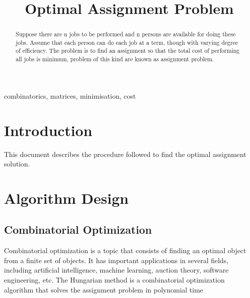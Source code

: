 \documentclass[conference]{IEEEtran}
\begin{document}
\title{Optimal Assignment Problem}

\author{
\and
{}
\and
{}

}

\maketitle

\begin{abstract}
Suppose there are n jobs to be performed and n persons are available for doing these jobs. Assume that each person can do each job at a term, though with varying degree of efficiency.
The problem is to find an assignment so that the total cost of performing all jobs is minimum, problem of this kind are known as assignment problem.
\end{abstract}

\begin{IEEEkeywords}
combinatorics, matrices, minimisation, cost
\end{IEEEkeywords}

\section{Introduction}
This document describes the procedure followed to find the optimal assignment solution.

\section{Algorithm Design}

\subsection{Combinatorial Optimization}

Combinatorial optimization is a topic that consists of finding an optimal object from a finite set of objects. It has important applications in several fields, including artificial intelligence, machine learning, auction theory, software engineering, etc. The Hungarian method is a combinatorial optimization algorithm that solves the assignment problem in polynomial time
\end{document}
